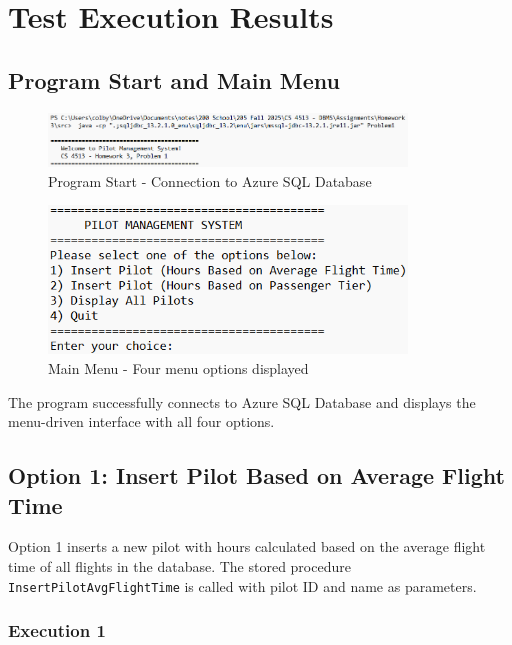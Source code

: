 \documentclass[12pt]{article}
\begin{document}
\newpage
\section{Test Execution Results}

\subsection{Program Start and Main Menu}

\begin{figure}[h]
\centering
\includegraphics[width=0.85\textwidth]{../../../Screenshots/Problem1/Other/Program_start.png}
\caption{Program Start - Connection to Azure SQL Database}
\label{fig:program_start}
\end{figure}

\begin{figure}[h]
\centering
\includegraphics[width=0.85\textwidth]{../../../Screenshots/Problem1/Other/Mainmenu.png}
\caption{Main Menu - Four menu options displayed}
\label{fig:main_menu}
\end{figure}

The program successfully connects to Azure SQL Database and displays the menu-driven interface with all four options.

\newpage
\subsection{Option 1: Insert Pilot Based on Average Flight Time}

Option 1 inserts a new pilot with hours calculated based on the average flight time of all flights in the database. The stored procedure \texttt{InsertPilotAvgFlightTime} is called with pilot ID and name as parameters.

\subsubsection{Execution 1}
\end{document}
